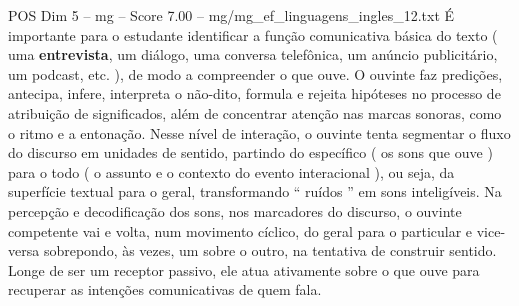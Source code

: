 \begin{textsample}{POS Dim 5 – mg – Score 7.00 – mg/mg\_ef\_linguagens\_ingles\_12.txt}
É importante para o estudante identificar a função comunicativa básica do texto ( uma \textbf{entrevista}, um diálogo, uma conversa telefônica, um anúncio publicitário, um podcast, etc. ), de modo a compreender o que ouve.
O ouvinte faz predições, antecipa, infere, interpreta o não-dito, formula e rejeita hipóteses no processo de atribuição de significados, além de concentrar atenção nas marcas sonoras, como o ritmo e a entonação.
Nesse nível de interação, o ouvinte tenta segmentar o fluxo do discurso em unidades de sentido, partindo do específico ( os sons que ouve ) para o todo ( o assunto e o contexto do evento interacional ), ou seja, da superfície textual para o geral, transformando “ ruídos ” em sons inteligíveis.
Na percepção e decodificação dos sons, nos marcadores do discurso, o ouvinte competente vai e volta, num movimento cíclico, do geral para o particular e vice-versa sobrepondo, às vezes, um sobre o outro, na tentativa de construir sentido.
Longe de ser um receptor passivo, ele atua ativamente sobre o que ouve para recuperar as intenções comunicativas de quem fala.

\end{textsample}
